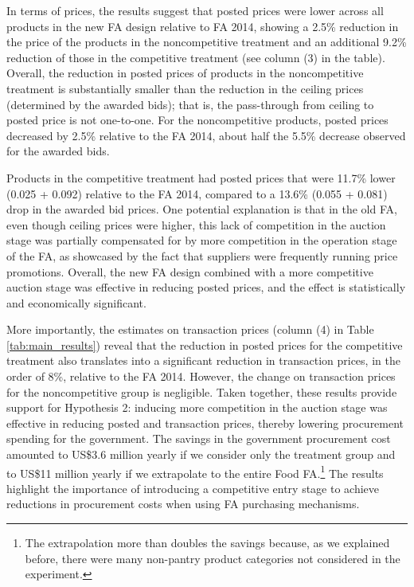 In terms of prices, the results suggest that posted prices were lower across all products in the new FA design relative to FA 2014, showing a 2.5\% reduction in the price of the products in the noncompetitive treatment and an additional 9.2\% reduction of those in the competitive treatment {(see column (3) in the table)}. Overall, the reduction in posted prices of products in the noncompetitive treatment is substantially smaller than the reduction in the ceiling prices (determined by the awarded bids); that is, the pass-through from ceiling to posted price is not one-to-one. 
For the noncompetitive products, posted prices decreased by 2.5\% relative to the FA 2014, about half the 5.5\% decrease observed for the awarded bids. 

Products in the competitive treatment had posted prices that were 11.7\% lower (0.025 + 0.092) relative to the FA 2014, compared to a 13.6\% (0.055 + 0.081) drop in the awarded bid prices. One potential explanation is that in the old FA, even though ceiling prices were higher, this lack of competition in the auction stage was partially compensated for by more competition in the operation stage of the FA, as showcased by the fact that suppliers were frequently running price promotions. Overall, the new FA design combined with a more competitive auction stage was effective in reducing posted prices, and the effect is statistically and economically significant.

More importantly, the estimates on transaction prices (column (4) in Table \ref{tab:main_results}) reveal that the reduction in posted prices for the competitive treatment also translates into a significant reduction in transaction prices, in the order of 8\%, relative to the FA 2014. However, the {change} on transaction prices for the noncompetitive group is negligible. Taken together, these results provide support for Hypothesis 2: inducing more competition in the auction stage was effective in reducing posted and transaction prices, thereby lowering procurement spending for the government.  The savings in the government procurement cost amounted to US\$3.6 million  yearly if we  consider only the treatment group and to US\$11 million yearly if we extrapolate to the
entire Food FA.\footnote{The extrapolation more than doubles the savings because, as we explained before, there were many non-pantry product categories not considered in the experiment.} The results highlight the importance of introducing  a competitive entry stage to achieve reductions in procurement costs when using FA purchasing mechanisms.



